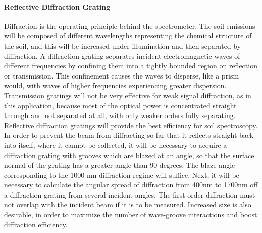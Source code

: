 \paragraph{Reflective Diffraction Grating}

Diffraction is the operating principle behind the spectrometer. The soil emissions will be composed of different wavelengths representing the chemical structure of the soil, and this will be increased under illumination and then separated by diffraction. A diffraction grating separates incident electromagnetic waves of different frequencies by confining them into a tightly bounded region on reflection or transmission. This confinement causes the waves to disperse, like a prism would, with waves of higher frequencies experiencing greater dispersion. Transmission gratings will not be very effective for weak signal diffraction, as in this application, because most of the optical power is concentrated straight through and not separated at all, with only weaker orders fully separating. Reflective diffraction gratings will provide the best efficiency for soil spectroscopy. In order to prevent the beam from diffracting so far that it reflects straight back into itself, where it cannot be collected, it will be necessary to acquire a diffraction grating with grooves which are blazed at an angle, so that the surface normal of the grating has a greater angle than 90 degrees. The blaze angle corresponding to the 1000 nm diffraction regime will suffice. Next, it will be necessary to calculate the angular spread of diffraction from 400nm to 1700nm off a diffraction grating from several incident angles. The first order diffraction must not overlap with the incident beam if it is to be measured. Increased size is also desirable, in order to maximize the number of wave-groove interactions and boost diffraction efficiency. 

